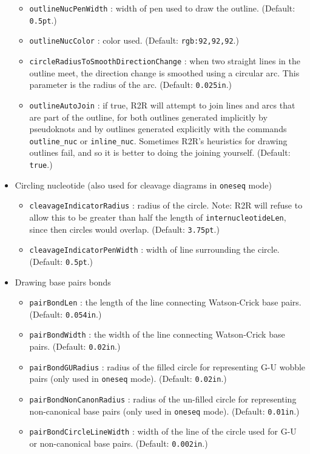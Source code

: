 \documentclass[letterpaper,12pt]{report}
\begin{document}
\begin{itemize}
\begin{itemize}
	\item {\tt outlineNucPenWidth} : width of pen used to draw the outline. (Default: {\tt 0.5pt}.)
	\item {\tt outlineNucColor} : color used. (Default: {\tt rgb:92,92,92}.)
	\item {\tt circleRadiusToSmoothDirectionChange} : when two straight lines in the outline meet, the direction change is smoothed using a circular arc.  This parameter is the radius of the arc.  (Default: {\tt 0.025in}.)
	\item {\tt outlineAutoJoin} : if true, R2R will attempt to join lines and arcs that are part of the outline, for both outlines generated implicitly by pseudoknots and by outlines generated explicitly with the commands {\tt outline\_nuc} or {\tt inline\_nuc}.  Sometimes R2R's heuristics for drawing outlines fail, and so it is better to doing the joining yourself.  (Default: {\tt true}.)
	\end{itemize}
\item Circling nucleotide (also used for cleavage diagrams in {\tt oneseq} mode)
	\begin{itemize}
	\item {\tt cleavageIndicatorRadius} : radius of the circle.  Note: R2R will refuse to allow this to be greater than half the length of {\tt internucleotideLen}, since then circles would overlap. (Default: {\tt 3.75pt}.)
	\item {\tt cleavageIndicatorPenWidth} : width of line surrounding the circle. (Default: {\tt 0.5pt}.)
	\end{itemize}
\item Drawing base pairs bonds
	\begin{itemize}
	\item {\tt pairBondLen} : the length of the line connecting Watson-Crick base pairs. (Default: {\tt 0.054in}.)	\item {\tt pairBondWidth} : the width of the line connecting Watson-Crick base pairs. (Default: {\tt 0.02in}.)
	\item {\tt pairBondGURadius} : radius of the filled circle for representing G-U wobble pairs (only used in {\tt oneseq} mode). (Default: {\tt 0.02in}.)
	\item {\tt pairBondNonCanonRadius} : radius of the un-filled circle for representing non-canonical base pairs (only used in {\tt oneseq} mode). (Default: {\tt 0.01in}.)
	\item {\tt pairBondCircleLineWidth} : width of the line of the circle used for G-U or non-canonical base pairs. (Default: {\tt 0.002in}.)

\end{itemize}
\end{itemize}
\end{document}
